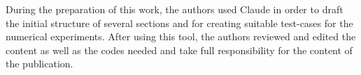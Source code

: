 \documentclass[pdflatex,sn-mathphys-num]{sn-jnl}%
\theoremstyle{thmstyleone}%
\theoremstyle{thmstyletwo}%
\theoremstyle{thmstylethree}%
\begin{document}
\backmatter






During the preparation of this work, the authors used Claude in order to draft the initial structure of several sections and for creating suitable test-cases for the numerical experiments. After using this tool, the authors reviewed and edited the content as well as the codes needed and take full responsibility for the content of the publication.




\end{document}
